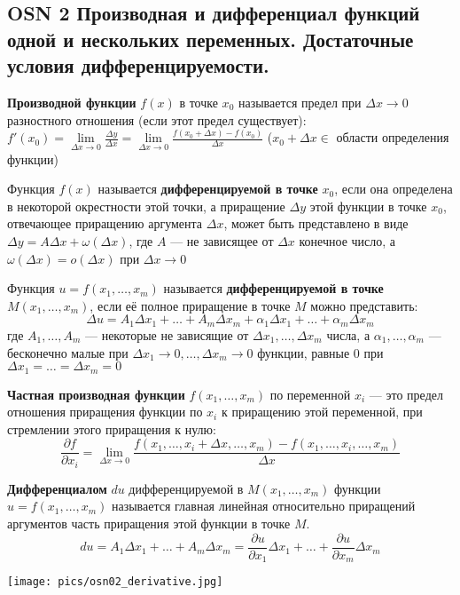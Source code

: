 \subsection{OSN 2 Производная и дифференциал функций одной и нескольких переменных. Достаточные условия дифференцируемости.}

\textbf{Производной функции} $f(x)$ в точке $x_0$ называется предел при $\Delta x \to 0$ разностного отношения (если этот предел существует): $f'(x_0) = \lim \limits_{\Delta x \to 0}\frac{\Delta y}{\Delta x} = \lim \limits_{\Delta x \to 0} \frac{f(x_0+\Delta x)-f(x_0)}{\Delta x}$ ($x_0 + \Delta x \in$ области определения функции)

\bigbreak
Функция $f(x)$ называется \textbf{дифференцируемой в точке} $x_0$, если она определена в некоторой окрестности этой точки, а приращение $\Delta y$ этой функции в точке $x_0$, отвечающее приращению аргумента $\Delta x$, может быть представлено в виде $\Delta y = A \Delta x+ \omega(\Delta x)$, где $A$ --- не зависящее от $\Delta x$ конечное число, а $\omega(\Delta x) = o(\Delta x)$ при $\Delta x \to 0$

\bigbreak
Функция $u = f(x_1,\dots,x_m)$ называется \textbf{дифференцируемой в точке $M(x_1,\dots,x_m)$}, если её полное приращение в точке $M$ можно представить: 
$$ \Delta u= A_1 \Delta x_1 +\dots+A_m \Delta x_m + \alpha_1 \Delta x_1 +\dots+ \alpha_m \Delta x_m $$
где $A_1, \dots, A_m$ --- некоторые не зависящие от $\Delta x_1, \dots, \Delta x_m$ числа, а $ \alpha_1, \dots, \alpha_m$ --- бесконечно малые при $\Delta x_1 \to 0, \dots, \Delta x_m \to 0$ функции, равные 0 при $\Delta x_1 = \dots = \Delta x_m = 0$

\bigbreak
\textbf{Частная производная функции} $f(x_1,\dots,x_m)$ по переменной $x_i$ --- это предел отношения приращения функции по $x_i$ к приращению этой переменной, при стремлении этого приращения к нулю: $$ \frac{\partial f}{\partial x_i} = \lim\limits_{\Delta x \to 0}\frac{ f(x_1,\dots,x_i +\Delta x,\dots,x_m)-f(x_1,\dots,x_i,\dots,x_m)}{\Delta x}$$

\bigbreak
\textbf{Дифференциалом} $du$ дифференцируемой в $M(x_1,\dots,x_m)$ функции $u = f(x_1,\dots,x_m)$ называется главная линейная относительно приращений аргументов часть приращения этой функции в точке $M.$
$$du=A_1\Delta x_1 +\dots+A_m \Delta x_m = \frac{\partial u}{\partial x_1}\Delta x_1 +\dots+ \frac{\partial u}{\partial x_m}\Delta x_m$$

\texttt{[image: pics/osn02\_derivative.jpg]}

